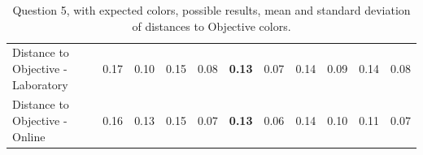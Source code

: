\begin{table}[H]
{\begin{tabular}{lccccccccccccc}
    \multicolumn{4}{l}{Distance to Objective - Laboratory}                                                                                           & \multicolumn{1}{|c}{0.17}       & \multicolumn{1}{c|}{0.10}    & \multicolumn{1}{|c}{0.15}       & \multicolumn{1}{c|}{0.08}    & \multicolumn{1}{|c}{\textbf{0.13}}       & \multicolumn{1}{c|}{0.07}    & \multicolumn{1}{|c}{0.14}       & \multicolumn{1}{c|}{0.09}    & \multicolumn{1}{|c}{0.14}       & \multicolumn{1}{c|}{0.08}    \\
    \multicolumn{4}{l}{Distance to Objective - Online}                                                                                               & \multicolumn{1}{|c}{0.16}        & \multicolumn{1}{c|}{0.13}    & \multicolumn{1}{|c}{0.15}        & \multicolumn{1}{c|}{0.07}    & \multicolumn{1}{|c}{\textbf{0.13}}       & \multicolumn{1}{c|}{0.06}    & \multicolumn{1}{|c}{0.14}        & \multicolumn{1}{c|}{0.10}    & \multicolumn{1}{|c}{0.11}       & \multicolumn{1}{c|}{0.07}    \\ \hline
    \end{tabular}}
  \caption[Question 5, with expected Results.]{Question 5, with expected colors, possible results, mean and standard deviation of distances to Objective colors.}
  \label{table:lab_q5_expected}
\end{table}
%
